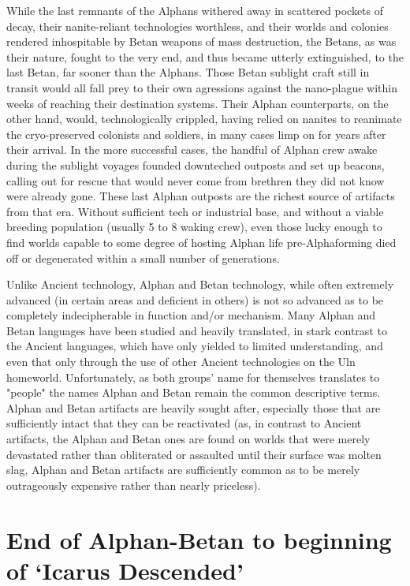 While the last remnants of the Alphans withered away in scattered
pockets of decay, their nanite-reliant technologies worthless, and
their worlds and colonies rendered inhospitable by Betan weapons of
mass destruction, the Betans, as was their nature, fought to the very
end, and thus became utterly extinguished, to the last Betan, far
sooner than the Alphans. Those Betan sublight craft still in transit
would all fall prey to their own agressions against the nano-plague
within weeks of reaching their destination systems. Their Alphan
counterparts, on the other hand, would, technologically crippled,
having relied on nanites to reanimate the cryo-preserved colonists and
soldiers, in many cases limp on for years after their arrival. In the
more successful cases, the handful of Alphan crew awake during the
sublight voyages founded downteched outposts and set up beacons,
calling out for rescue that would never come from brethren they did
not know were already gone. These last Alphan outposts are the richest
source of artifacts from that era. Without sufficient tech or
industrial base, and without a viable breeding population (usually 5
to 8 waking crew), even those lucky enough to find worlds capable to
some degree of hosting Alphan life pre-Alphaforming died off or
degenerated within a small number of generations.

Unlike Ancient technology, Alphan and Betan technology, while often
extremely advanced (in certain areas and deficient in others) is not
so advanced as to be completely indecipherable in function and/or
mechanism. Many Alphan and Betan languages have been studied and
heavily translated, in stark contrast to the Ancient languages, which
have only yielded to limited understanding, and even that only through
the use of other Ancient technologies on the Uln
homeworld. Unfortunately, as both groups' name for themselves
translates to "people" the names Alphan and Betan remain the common
descriptive terms. Alphan and Betan artifacts are heavily sought
after, especially those that are sufficiently intact that they can be
reactivated (as, in contrast to Ancient artifacts, the Alphan and
Betan ones are found on worlds that were merely devastated rather than
obliterated or assaulted until their surface was molten slag, Alphan
and Betan artifacts are sufficiently common as to be merely
outrageously expensive rather than nearly priceless).

\section{End of Alphan-Betan to beginning of `Icarus Descended'}
